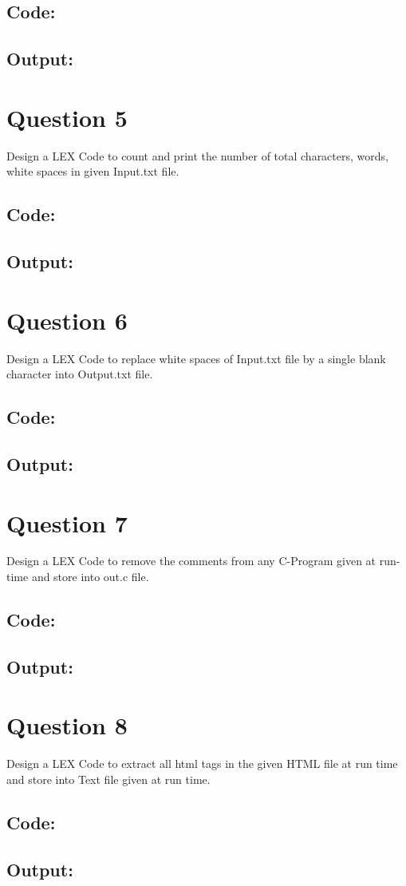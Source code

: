 \documentclass{article}
\begin{document}
\subsection*{Code:}

\newpage
\subsection*{Output:}


\newpage
\section*{Question 5}
Design a LEX Code to count and print the number of total 
characters, words, white spaces in given Input.txt file.
\subsection*{Code:}

\newpage
\subsection*{Output:}


\newpage
\section*{Question 6}
Design a LEX Code to replace white spaces of Input.txt
file by a single blank character into Output.txt file.
\subsection*{Code:}

\newpage
\subsection*{Output:}


\newpage
\section*{Question 7}
Design a LEX Code to remove the comments from any C-Program
 given at run-time and store into out.c file.
\subsection*{Code:}

\newpage
\subsection*{Output:}


\newpage
\section*{Question 8}
Design a LEX Code to extract all html tags in the given HTML file 
at run time and store into Text file given at run time.
\subsection*{Code:}

\newpage
\subsection*{Output:}

\end{document}
